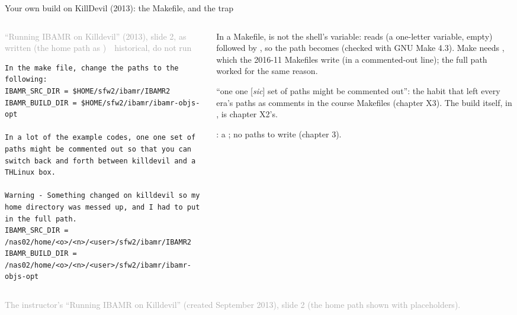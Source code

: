 \documentclass[aspectratio=169,11pt]{beamer}
\newcommand{\sourcecredit}[1]{\vfill\begin{flushright}\tiny\textcolor{DarkGray}{#1}\end{flushright}}
\newcommand{\hist}[1]{{\tiny\sffamily\textcolor{DarkGray}{#1\ \textbullet\ historical, do not run}}\par\nointerlineskip\vspace{0.3mm}}
\begin{document}
\begin{frame}[fragile]{Your own build on KillDevil (2013): the Makefile, and the  trap}
\label{fr:a4make}
\begin{columns}[T,onlytextwidth]
\begin{column}{0.53\textwidth}
\hist{``Running IBAMR on Killdevil'' (2013), slide 2, as written (the home path as \code{<o>/<n>/<user>})}
\begin{lstlisting}[style=hist]
In the make file, change the paths to the following:
IBAMR_SRC_DIR = $HOME/sfw2/ibamr/IBAMR2
IBAMR_BUILD_DIR = $HOME/sfw2/ibamr/ibamr-objs-opt

In a lot of the example codes, one one set of paths might be commented out so that you can switch back and forth between killdevil and a THLinux box.

Warning - Something changed on killdevil so my home directory was messed up, and I had to put in the full path.
IBAMR_SRC_DIR = /nas02/home/<o>/<n>/<user>/sfw2/ibamr/IBAMR2
IBAMR_BUILD_DIR = /nas02/home/<o>/<n>/<user>/sfw2/ibamr/ibamr-objs-opt
\end{lstlisting}
\end{column}
\begin{column}{0.44\textwidth}
\begin{homebox}
\footnotesize {} In a Makefile,  is not the shell's variable:  reads  (a one-letter variable, empty) followed by , so the path becomes  (checked with GNU Make 4.3). Make needs , which the 2016-11 Makefiles write (in a commented-out line); the full path worked for the same reason.
\end{homebox}
\vspace{1mm}
\scriptsize ``one one [\emph{sic}] set of paths might be commented out'': the habit that left every era's paths as comments in the course Makefiles (chapter X3). The build itself, in , is chapter X2's.

\vspace{1mm}
: a ; no paths to write (chapter 3).
\end{column}
\end{columns}
\sourcecredit{The instructor's ``Running IBAMR on Killdevil'' (created September 2013), slide 2 (the home path shown with placeholders).}
\end{frame}
\end{document}
